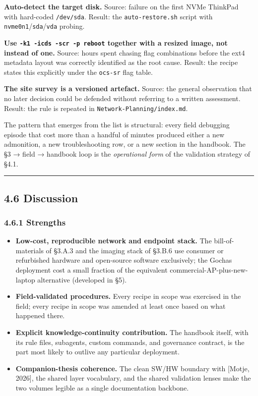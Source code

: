 \textbf{Auto-detect the target disk.} Source: failure on the first NVMe
ThinkPad with hard-coded \texttt{/dev/sda}. Result: the
\texttt{auto-restore.sh} script with
\texttt{nvme0n1}/\texttt{sda}/\texttt{vda} probing.

\textbf{Use \texttt{-k1\ -icds\ -scr\ -p\ reboot} together with a
resized image, not instead of one.} Source: hours spent chasing flag
combinations before the ext4 metadata layout was correctly identified as
the root cause. Result: the recipe states this explicitly under the
\texttt{ocs-sr} flag table.

\textbf{The site survey is a versioned artefact.} Source: the general
observation that no later decision could be defended without referring
to a written assessment. Result: the rule is repeated in
\texttt{Network-Planning/index.md}.

The pattern that emerges from the list is structural: every field
debugging episode that cost more than a handful of minutes produced
either a new admonition, a new troubleshooting row, or a new section in
the handbook. The §3 → field → handbook loop is the \emph{operational
form} of the validation strategy of §4.1.

\begin{center}\rule{0.5\linewidth}{0.5pt}\end{center}

\hypertarget{discussion}{%
\subsection{4.6 Discussion}\label{discussion}}

\hypertarget{strengths}{%
\subsubsection{4.6.1 Strengths}\label{strengths}}

\begin{itemize}
\tightlist
\item
  \textbf{Low-cost, reproducible network and endpoint stack.} The
  bill-of-materials of §3.A.3 and the imaging stack of §3.B.6 use
  consumer or refurbished hardware and open-source software exclusively;
  the Gochas deployment cost a small fraction of the equivalent
  commercial-AP-plus-new-laptop alternative (developed in §5).
\item
  \textbf{Field-validated procedures.} Every recipe in scope was
  exercised in the field; every recipe in scope was amended at least
  once based on what happened there.
\item
  \textbf{Explicit knowledge-continuity contribution.} The handbook
  itself, with its rule files, subagents, custom commands, and
  governance contract, is the part most likely to outlive any particular
  deployment.
\item
  \textbf{Companion-thesis coherence.} The clean SW/HW boundary with
  {[}Motje, 2026{]}, the shared layer vocabulary, and the shared
  validation lenses make the two volumes legible as a single
  documentation backbone.
\end{itemize}

